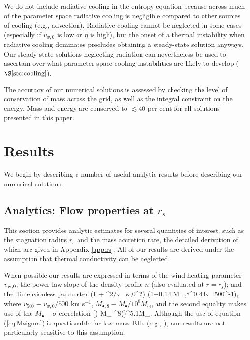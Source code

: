\documentclass[usenatbib,fleqn]{mn2e}
\newcommand{\rs}{r_s}
\newcommand{\Mbheight}{M_{\bullet,8}}
\newcommand{\vwO}{v_{w,0}}
\begin{document}
We do not include radiative cooling in the entropy equation because
across much of the parameter space radiative cooling is negligible
compared to other sources of cooling (e.g., advection).  Radiative
cooling cannot be neglected in some cases (especially if $\vwO$ is low
or $\eta$ is high), but the onset of a thermal instability when
radiative cooling dominates precludes obtaining a steady-state
solution anyways.  Our steady state solutions neglecting radiation can
nevertheless be used to ascertain over what parameter space cooling
instabilities are likely to develop ($\S\ref{sec:cooling}$).

The accuracy of our numerical solutions is assessed by checking the
level of conservation of mass across the grid, as well as the integral
constraint on the energy.  Mass and energy are conserved to $\lesssim
40$ per cent for all solutions presented in this
paper. %


\section{Results}

We begin by describing a number of useful analytic results before describing our numerical solutions.  

\label{sec:results}
\subsection{Analytics: Flow properties at $\rs$}

This section provides analytic estimates for several quantities of
interest, such as the stagnation radius $\rs$ and the mass accretion
rate, the detailed derivation of which are given in Appendix
\ref{app:rs}.  All of our results are derived under the assumption
that thermal conductivity can be neglected.

When possible our results are expressed in terms of the wind heating
parameter $v_{\rm w,0}$; the power-law slope of the density profile
$n$ (also evaluated at $r = \rs$); and the dimensionless parameter \be
\chi \equiv \left(1 + \sigma^{2}/v_{\rm w,0}^{2}\right) \approx
\left(1+0.14 \Mbheight^{0.43}v_{500}^{-1}\right), \ee where $v_{500}
\equiv v_{w,0}/500$ km s$^{-1}$, $M_{\bullet,8} \equiv
M_{\bullet}/10^{8}M_{\odot}$, and the second equality makes use of the
$M_{\bullet}-\sigma$ correlation (\citealt{Gultekin+09}) \be
M_{\bullet} ^{8}\left(\right)^{5.1}M_{\odot}.
\label{eq:Msigma}
\ee
Although the use of equation (\ref{eq:Msigma}) is questionable for low mass BHs (e.g., \citealt{Greene&Ho07}), our results are not particularly sensitive to this assumption.  
\end{document}
